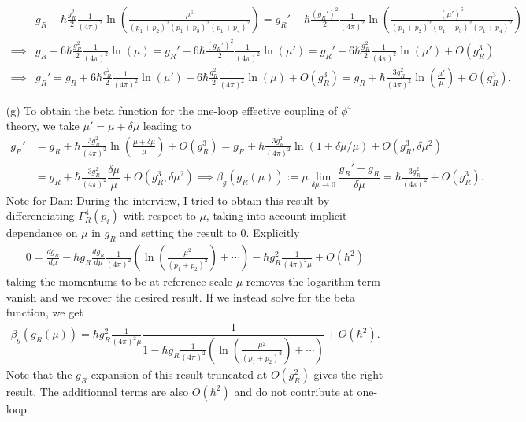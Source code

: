 \documentclass[10pt, a4paper]{article}
\begin{document}
\begin{enumerate}
  \begin{align*}
    &g_R - \hbar \frac{g_R^2}{2}\frac{1}{(4\pi)^2}\ln\left(\frac{\mu^6}{(p_1 + p_2)^2 (p_1 + p_3)^2 (p_1 + p_4)^2}\right)  = g_R' - \hbar \frac{(g_R')^2}{2}\frac{1}{(4\pi)^2}\ln\left(\frac{(\mu')^6}{(p_1 + p_2)^2 (p_1 + p_3)^2 (p_1 + p_4)^2}\right)\\
    \implies &g_R - 6\hbar \frac{g_R^2}{2}\frac{1}{(4\pi)^2}\ln\left(\mu\right)  = g_R' - 6\hbar \frac{(g_R')^2}{2}\frac{1}{(4\pi)^2}\ln\left(\mu'\right) =  g_R' - 6\hbar \frac{g_R^2}{2}\frac{1}{(4\pi)^2}\ln\left(\mu'\right) + O(g_R^3)\\
    \implies  &  g_R' = g_R + 6\hbar \frac{g_R^2}{2}\frac{1}{(4\pi)^2}\ln\left(\mu'\right) - 6\hbar \frac{g_R^2}{2}\frac{1}{(4\pi)^2}\ln\left(\mu\right) + O(g_R^3) =  g_R + \hbar \frac{3g_R^2}{(4\pi)^2}\ln\left(\frac{\mu'}{\mu}\right)  + O(g_R^3). 
  \end{align*}
  \item[(g)] To obtain the beta function for the one-loop effective coupling of $\phi^4$ theory, we take $\mu' = \mu + \delta \mu$ leading to 
  \begin{align*}
    g_R' &=  g_R + \hbar \frac{3g_R^2}{(4\pi)^2}\ln\left(\frac{\mu+\delta \mu}{\mu}\right)  + O(g_R^3) = g_R + \hbar \frac{3g_R^2}{(4\pi)^2}\ln\left(1 + \delta \mu/\mu\right)  + O(g_R^3, \delta \mu^2)\\
    &=  g_R + \hbar \frac{3g_R^2}{(4\pi)^2} \dfrac{\delta \mu}{\mu}  + O(g_R^3, \delta \mu^2) \implies \beta_g(g_R(\mu)) := \mu \lim_{\delta\mu \to 0}\dfrac{g_R' - g_R}{\delta \mu} = \hbar \frac{3g_R^2}{(4\pi)^2} + O(g_R^3). 
  \end{align*}
  Note for Dan: During the interview, I tried to obtain this result by differenciating $\Gamma^{4}_R(p_i)$ with respect to $\mu$, taking into account implicit dependance on $\mu$ in $g_R$ and setting the result to $0$. Explicitly
  \begin{align*}
   0 = \frac{d g_R}{d\mu} - \hbar g_R\frac{d g_R}{d\mu}\frac{1}{(4\pi)^2}\left(\ln\left(\frac{\mu^2}{(p_1 + p_2)^2}\right) + \cdots\right) - \hbar g_R^2 \frac{1}{(4\pi)^2 \mu} + O(\hbar^2)
  \end{align*}
  taking the momentums to be at reference scale $\mu$ removes the logarithm term vanish and we recover the desired result. If we instead solve for the beta function, we get 
  \begin{align*}
    \beta_g(g_R(\mu)) = \hbar g_R^2 \frac{1}{(4\pi)^2 \mu} \dfrac{1}{1-\hbar g_R\frac{1}{(4\pi)^2}\left(\ln\left(\frac{\mu^2}{(p_1 + p_2)^2}\right)+ \cdots\right)} + O(\hbar^2).
   \end{align*}
  Note that the $g_R$ expansion of this result truncated at $O(g_R^2)$ gives the right result. The additionnal terms are also $O(\hbar^2)$ and do not contribute at one-loop. 


\end{enumerate}
\end{document}
